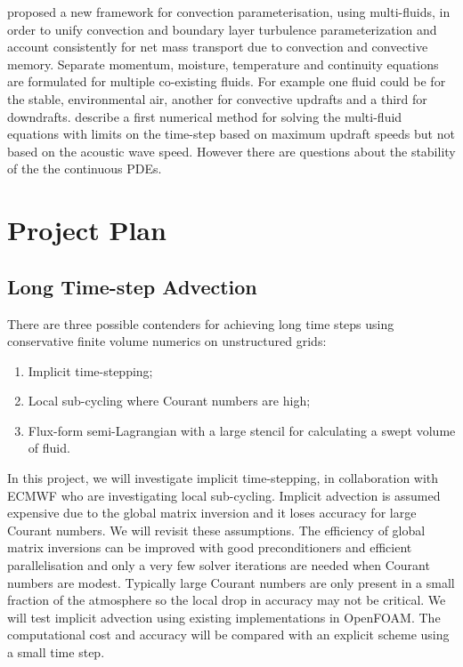 \cite{TWV+18} proposed a new framework for convection parameterisation, using multi-fluids, in order to unify convection and boundary layer turbulence parameterization and account consistently for net mass transport due to convection and convective memory. Separate momentum, moisture, temperature and continuity equations are formulated for multiple co-existing fluids. For example one fluid could be for the stable, environmental air, another for convective updrafts and a third for downdrafts. \cite{WM19} describe a first numerical method for solving the multi-fluid equations with limits on the time-step based on maximum updraft speeds but not based on the acoustic wave speed. However there are questions about the stability of the the continuous PDEs.

\section{Project Plan}

\subsection{Long Time-step Advection}

There are three possible contenders for achieving long time steps using conservative finite volume numerics on unstructured grids:
\begin{enumerate}
\item Implicit time-stepping;
\item Local sub-cycling where Courant numbers are high;
\item Flux-form semi-Lagrangian with a large stencil for calculating a swept volume of fluid.
\end{enumerate}
In this project, we will investigate implicit time-stepping, in collaboration with ECMWF who are investigating local sub-cycling. Implicit advection is assumed expensive due to the global matrix inversion and it loses accuracy for large Courant numbers. We will revisit these assumptions. The efficiency of global matrix inversions can be improved with good preconditioners and efficient parallelisation and only a very few solver iterations are needed when Courant numbers are modest. Typically large Courant numbers are only present in a small fraction of the atmosphere so the local drop in accuracy may not be critical. We will test implicit advection using existing implementations in OpenFOAM. The computational cost and accuracy will be compared with an explicit scheme using a small time step.

